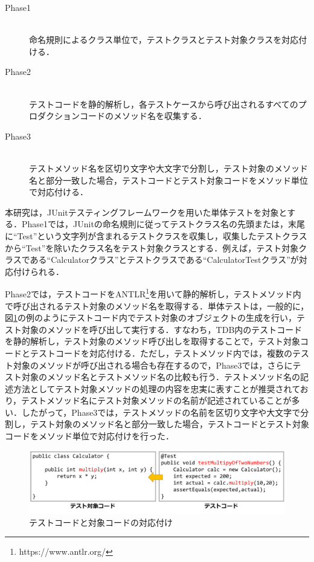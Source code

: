 \documentclass[12pt]{jarticle} %
\begin{document}
\begin{description}
\item[Phase1]~\\
命名規則によるクラス単位で，テストクラスとテスト対象クラスを対応付ける．
\item[Phase2]~\\
テストコードを静的解析し，各テストケースから呼び出されるすべてのプロダクションコードのメソッド名を収集する．
\item[Phase3]~\\
テストメソッド名を区切り文字や大文字で分割し，テスト対象のメソッド名と部分一致した場合，テストコードとテスト対象コードをメソッド単位で対応付ける．
\end{description}


本研究は，JUnitテスティングフレームワークを用いた単体テストを対象とする．Phase1では，JUnitの命名規則に従ってテストクラス名の先頭または，末尾に``Test''という文字列が含まれるテストクラスを収集し，収集したテストクラスから``Test''を除いたクラス名をテスト対象クラスとする．例えば，テスト対象クラスである``Calculatorクラス''とテストクラスである``CalculatorTestクラス''が対応付けられる．

Phase2では，テストコードをANTLR\footnote{https://www.antlr.org/}を用いて静的解析し，テストメソッド内で呼び出されるテスト対象のメソッド名を取得する．単体テストは，一般的に，図\ref{mapping}の例のようにテストコード内でテスト対象のオブジェクトの生成を行い，テスト対象のメソッドを呼び出して実行する．すなわち，TDB内のテストコードを静的解析し，テスト対象のメソッド呼び出しを取得することで，テスト対象コードとテストコードを対応付ける．ただし，テストメソッド内では，複数のテスト対象のメソッドが呼び出される場合も存在するので，Phase3では，さらにテスト対象のメソッド名とテストメソッド名の比較も行う．テストメソッド名の記述方法としてテスト対象メソッドの処理の内容を忠実に表すことが推奨されており，テストメソッド名にテスト対象メソッドの名前が記述されていることが多い\cite{b22}．したがって，Phase3では，テストメソッドの名前を区切り文字や大文字で分割し，テスト対象のメソッド名と部分一致した場合，テストコードとテスト対象コードをメソッド単位で対応付けを行った．

\begin{figure}[htbp]
\begin{center}
\includegraphics[clip,width=15cm]{image/mapping.pdf}
\caption{テストコードと対象コードの対応付け}
\label{mapping}
\end{center}
\end{figure}
\end{document}
